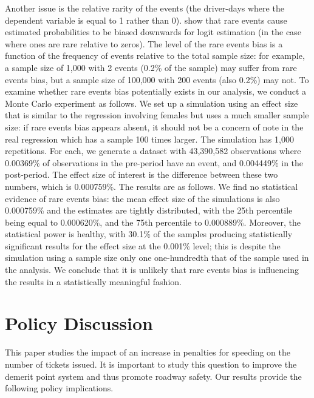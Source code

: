 \documentclass{cje}
\begin{document}
Another issue is the relative rarity of the events 
(the driver-days where the dependent variable is equal to 1 rather than 0). 
\citet{kingzheng2001}
show that rare events cause estimated probabilities to be biased downwards for logit estimation 
(in the case where ones are rare relative to zeros). 
The level of the rare events bias is a function of 
the frequency of events relative to the total sample size: 
for example, a sample size of 1,000 with 2 events (0.2\% of the sample) 
may suffer from rare events bias, 
but a sample size of 100,000 with 200 events (also 0.2\%) may not. 
To examine whether rare events bias potentially exists in our analysis, 
we conduct a Monte Carlo experiment as follows. 
We set up a simulation using an effect size that is similar to the regression involving females but uses a much smaller sample size: 
if rare events bias appears absent, 
it should not be a concern of note in the real regression 
which has a sample 100 times larger. 
The simulation has 1,000 repetitions. 
For each, we generate a dataset with 43,390,582 observations 
where 0.00369\% of observations in the pre-period have an event, 
and 0.004449\% in the post-period. 
The effect size of interest is the difference between these two numbers, which is 0.000759\%. 
The results are as follows. 
We find no statistical evidence of rare events bias: 
the mean effect size of the simulations is also 0.000759\% 
and the estimates are tightly distributed, 
with the 25th percentile being equal to 0.000620\%, 
and the 75th percentile to 0.000889\%. 
Moreover, the statistical power is healthy, 
with 30.1\% of the samples producing statistically significant results 
for the effect size at the 0.001\% level; 
this is despite the simulation using a sample size only one one-hundredth 
that of the sample used in the analysis. 
We conclude that it is unlikely that rare events bias 
is influencing the results in a statistically meaningful fashion.




\section{Policy Discussion}
\label{sec:Discussion}

This paper studies the impact of an increase in penalties for speeding 
on the number of tickets issued. 
It is important to study this question to improve the demerit point system 
and thus promote roadway safety. 
Our results provide the following policy implications.
\end{document}

